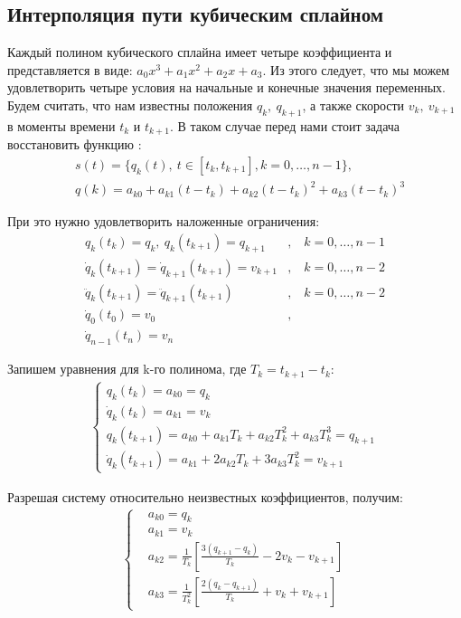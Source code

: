 \subsection{Интерполяция пути кубическим сплайном} \label{subsect5_2_1}
Каждый полином кубического сплайна имеет четыре коэффициента и представляется в виде: $a_{0}x^{3} + a_{1}x^{2} + a_{2}x + a_{3}$. Из этого следует, что мы можем удовлетворить четыре условия на начальные и конечные значения переменных. Будем считать, что нам известны положения $q_{k},\ q_{k+1}$, а также скорости $v_{k},\ v_{k+1}$ в моменты времени $t_{k}$ и $t_{k+1}$. В таком случае перед нами стоит задача восстановить функцию \cite{Biagiotti}:
\begin{align*}
	&s(t) = \{q_{k}(t),\ t \in [t_{k}, t_{k+1}],	k=0,\dotsc,n-1\},\\
	&q(k) = a_{k0} + a_{k1}(t - t_{k}) + a_{k2}(t - t_{k})^{2} + a_{k3}(t - t_{k})^{3}
\end{align*}

При это нужно удовлетворить наложенные ограничения:
\begin{align*}
	q_{k}(t_{k}) = q_{k},\ q_{k}(t_{k+1}) = q_{k+1}&,				&\	k=0,\dotsc,n-1\\
	\dot{q}_{k}(t_{k+1}) = \dot{q}_{k+1}(t_{k+1}) = v_{k+1}&,		&\	k=0,\dotsc,n-2\\
	\ddot{q}_{k}(t_{k+1}) = \ddot{q}_{k+1}(t_{k+1})&,				&\	k=0,\dotsc,n-2\\
	\dot{q}_{0}(t_{0}) = v_{0}&,\\
	\dot{q}_{n-1}(t_{n}) = v_{n}&
\end{align*}

Запишем уравнения для k-го полинома, где $T_{k} = t_{k+1} - t_{k}$:
\begin{align*}
	\begin{cases}
		q_{k}(t_{k}) = a_{k0} = q_{k}\\
		\dot{q}_{k}(t_{k}) = a_{k1} = v_{k}\\
		q_{k}(t_{k+1}) = a_{k0} + a_{k1}T_{k} + a_{k2}T_{k}^{2} + a_{k3}T_{k}^{3} = q_{k+1}\\
		\dot{q}_{k}(t_{k+1}) = a_{k1}+ 2a_{k2}T_{k} + 3a_{k3}T_{k}^{2} = v_{k+1}
	\end{cases}
\end{align*}

Разрешая систему относительно неизвестных коэффициентов, получим:
\begin{align*}
	\begin{cases}
		&a_{k0} = q_{k}\\
		&a_{k1} = v_{k}\\
		&a_{k2} = \frac{1}{T_{k}}[\frac{3(q_{k+1} - q_{k})}{T_{k}} - 2v_{k} - v_{k+1}]\\
		&a_{k3} = \frac{1}{T_{k}^2}[\frac{2(q_{k} - q_{k+1})}{T_{k}} + v_{k} + v_{k+1}]
	\end{cases}
\end{align*}

